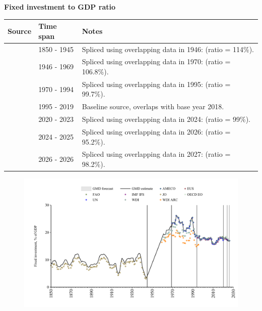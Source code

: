 \documentclass[12pt,a4paper,landscape]{article}
\begin{document}
\begin{adjustbox}{max totalsize={\paperwidth}{\paperheight},center}
\begin{minipage}[t][\textheight][t]{\textwidth}
\vspace*{0.5cm}
{}
\begin{center}
{\Large\bfseries Fixed investment to GDP ratio}
\end{center}
\vspace{0.5cm}
\begin{table}[H]
\centering
\small
\begin{tabular}{|l|l|l|}
\hline
\textbf{Source} & \textbf{Time span} & \textbf{Notes} \\
\hline
\rowcolor{white}\cite{JO}& 1850 - 1945 &Spliced using overlapping data in 1946: (ratio = 114\%). \\
\rowcolor{lightgray}\cite{OECD_EO}& 1946 - 1969 &Spliced using overlapping data in 1970: (ratio = 106.8\%). \\
\rowcolor{white}\cite{WDI}& 1970 - 1994 &Spliced using overlapping data in 1995: (ratio = 99.7\%). \\
\rowcolor{lightgray}\cite{EUS}& 1995 - 2019 &Baseline source, overlaps with base year 2018. \\
\rowcolor{white}\cite{WDI}& 2020 - 2023 &Spliced using overlapping data in 2024: (ratio = 99\%). \\
\rowcolor{lightgray}\cite{OECD_EO}& 2024 - 2025 &Spliced using overlapping data in 2026: (ratio = 95.2\%). \\
\rowcolor{white}\cite{AMECO}& 2026 - 2026 &Spliced using overlapping data in 2027: (ratio = 98.2\%). \\
\hline
\end{tabular}
\end{table}
\begin{figure}[H]
\centering
\includegraphics[width=\textwidth,height=0.6\textheight,keepaspectratio]{graphs/GBR_finv_GDP.pdf}
\end{figure}
\end{minipage}
\end{adjustbox}
\end{document}
